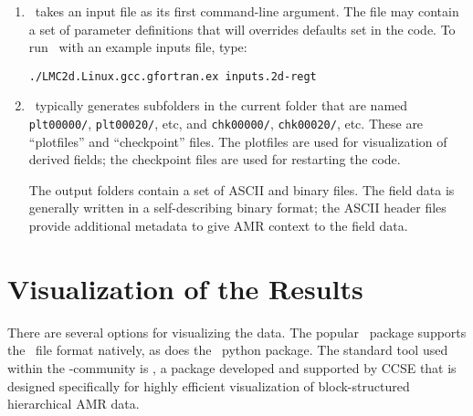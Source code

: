 \begin{enumerate}

\item \lmc\ takes an input file as its first command-line argument.  The file may
contain a set of parameter definitions that will overrides defaults set in the code.
  To run \lmc\ with an example inputs file, type:
\begin{verbatim}
./LMC2d.Linux.gcc.gfortran.ex inputs.2d-regt
\end{verbatim}

\item \lmc\ typically generates subfolders in the current folder that
  are named {\tt plt00000/}, {\tt plt00020/}, etc, and {\tt chk00000/},
  {\tt chk00020/}, etc. These are ``plotfiles'' and ``checkpoint''
  files. The plotfiles are used for visualization of derived fields; the checkpoint
  files are used for restarting the code.

  The output folders contain a set of ASCII and binary files.  The field
  data is generally written in a self-describing binary format; the 
  ASCII header files provide additional metadata to give AMR context to the field data.

\end{enumerate}

\section{Visualization of the Results}

There are several options for visualizing the data.  The popular
\visit\ package supports the \boxlib\ file format natively, as does
the \yt\ python package.  The standard tool used within the
\boxlib-community is \amrvis, a package developed and supported 
by CCSE that is designed specifically for highly efficient visualization
of block-structured hierarchical AMR data.

